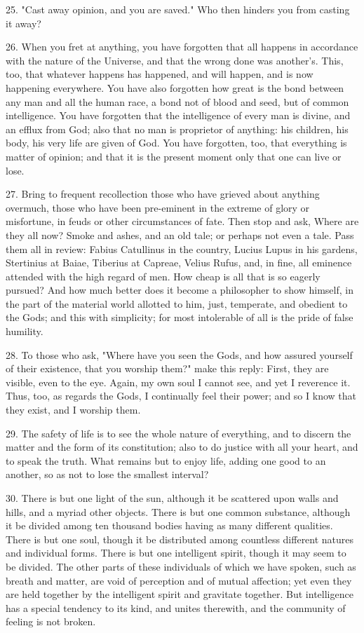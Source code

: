 \documentclass{book}
\begin{document}
25. "Cast away opinion, and you are saved." Who then hinders you from
casting it away?

26. When you fret at anything, you have forgotten that all happens in
accordance with the nature of the Universe, and that the wrong done
was another's. This, too, that whatever happens has happened, and will
happen, and is now happening everywhere. You have also forgotten how
great is the bond between any man and all the human race, a bond not
of blood and seed, but of common intelligence. You have forgotten that
the intelligence of every man is divine, and an efflux from God; also
that no man is proprietor of anything: his children, his body, his
very life are given of God. You have forgotten, too, that everything is
matter of opinion; and that it is the present moment only that one can
live or lose.

27. Bring to frequent recollection those who have grieved about
anything overmuch, those who have been pre-eminent in the extreme of
glory or misfortune, in feuds or other circumstances of fate. Then
stop and ask, Where are they all now? Smoke and ashes, and an old
tale; or perhaps not even a tale. Pass them all in review: Fabius
Catullinus in the country, Lucius Lupus in his gardens, Stertinius at
Baiae, Tiberius at Capreae, Velius Rufus, and, in fine, all eminence
attended with the high regard of men. How cheap is all that is so
eagerly pursued? And how much better does it become a philosopher to
show himself, in the part of the material world allotted to him, just,
temperate, and obedient to the Gods; and this with simplicity; for
most intolerable of all is the pride of false humility.

28. To those who ask, "Where have you seen the Gods, and how assured
yourself of their existence, that you worship them?" make this reply:
First, they are visible, even to the eye. Again, my own soul I cannot
see, and yet I reverence it. Thus, too, as regards the Gods, I
continually feel their power; and so I know that they exist, and I
worship them.

29. The safety of life is to see the whole nature of everything, and
to discern the matter and the form of its constitution; also to do
justice with all your heart, and to speak the truth. What remains but
to enjoy life, adding one good to an another, so as not to lose the
smallest interval?

30. There is but one light of the sun, although it be scattered upon
walls and hills, and a myriad other objects. There is but one common
substance, although it be divided among ten thousand bodies having as
many different qualities.  There is but one soul, though it be
distributed among countless different natures and individual
forms. There is but one intelligent spirit, though it may seem to be
divided. The other parts of these individuals of which we have spoken,
such as breath and matter, are void of perception and of mutual
affection; yet even they are held together by the intelligent spirit
and gravitate together. But intelligence has a special tendency to its
kind, and unites therewith, and the community of feeling is not
broken.
\end{document}
